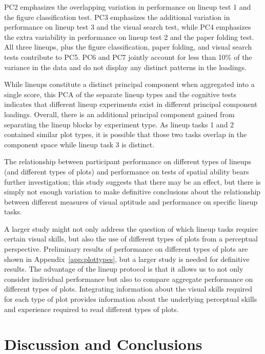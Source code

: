 \documentclass[journal]{vgtc}\usepackage[]{graphicx}\usepackage[]{color}
\begin{document}
PC2 emphasizes the overlapping variation in performance on lineup test 1 and the figure classification test. PC3 emphasizes the additional variation in performance on lineup test 3 and the visual search test, while PC4 emphasizes the extra variability in performance on lineup test 2 and the paper folding test. All three lineups, plus the figure classification, paper folding, and visual search tests contribute to PC5. PC6 and PC7 jointly account for less than 10\% of the variance in the data and do not display any distinct patterns in the loadings. 

While lineups constitute a distinct principal component when aggregated into a single score, this PCA of the separate lineup types and the cognitive tests indicates that different lineup experiments exist in different principal component loadings. Overall, there is an additional principal component gained from separating the lineup blocks by experiment type. As lineup tasks 1 and 2 contained similar plot types, it is possible that those two tasks overlap in the component space while lineup task 3 is distinct. 




The relationship between participant performance on different types of lineups (and different types of plots) and performance on tests of spatial ability bears further investigation; this study suggests that there may be an effect, but there is simply not enough variation to make definitive conclusions about the relationship between different measures of visual aptitude and performance on specific lineup tasks. 

A larger study might not only address the question of which lineup tasks require certain visual skills, but also the use of different types of plots from a perceptual perspective. Preliminary results of performance on different types of plots are shown in Appendix~\ref{app:plottypes}, but a larger study is needed for definitive results. The advantage of the lineup protocol is that it allows us to not only consider individual performance but also to compare aggregate performance on different types of plots. Integrating information about the visual skills required for each type of plot provides information about the underlying perceptual skills and experience required to read different types of plots.


\section{Discussion and Conclusions}\label{sec:discussion}
\end{document}
